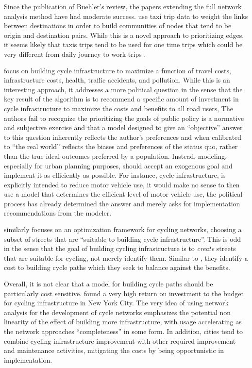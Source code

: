 Since the publication of Buehler's review, the papers extending the full network analysis method have had moderate success. \textcite{akbarzadeh2018designing} use taxi trip data to weight the links between destinations in order to build communities of nodes that tend to be origin and destination pairs. While this is a novel approach to prioritizing edges, it seems likely that taxis trips tend to be used for one time trips which could be very different from daily journey to work trips \parencite{jtw}.

\textcite{doorley2019designing} focus on building cycle infrastructure to maximize a function of travel costs, infrastructure costs, health, traffic accidents, and pollution. While this is an interesting approach, it addresses a more political question in the sense that the key result of the algorithm is to recommend a specific amount of investment in cycle infrastructure to maximize the costs and benefits to all road users, The authors fail to recognize the prioritizing the goals of public policy is a normative and subjective exercise and that a model designed to give an ``objective'' answer to this question inherently reflects the author's preferences and when calibrated to ``the real world'' reflects the biases and preferences of the status quo, rather than the true ideal outcomes preferred by a population. Instead, modeling, especially for urban planning purposes, should accept an exogenous goal and implement it as efficiently as possible. For instance, cycle infrastructure, is explicitly intended to reduce motor vehicle use, it would make no sense to then use a model that determines the efficient level of motor vehicle use, the political process has already determined the answer and merely asks for implementation recommendations from the modeler. 

\textcite{mauttone2017bicycle} similarly focuses on an optimization framework for cycling networks, choosing a subset of streets that are ``suitable to building cycle infrastructure''. This is odd in the sense that the goal of building cycling infrastructure is to \textit{create} streets that are suitable for cycling, not merely identify them. Similar to \textcite{doorley2019designing}, they identify a cost to building cycle paths which they seek to balance against the benefits. 

Overall, it is not clear that a model for building cycle paths should be particularly cost sensitive. \textcite{gu2017cost} found a very high return on investment to the budget for cycling infrastructure in New York City. The very idea of using network analysis for the development of cycle networks emphasizes the potential non linearity of the effect of building more infrastructure, with usage accelerating as the network approaches ``completeness'' in some form. In addition, cities tend to combine cycling infrastructure improvement with other required improvement and maintenance activities, mitigating the costs by being opportunistic in implementation. 

